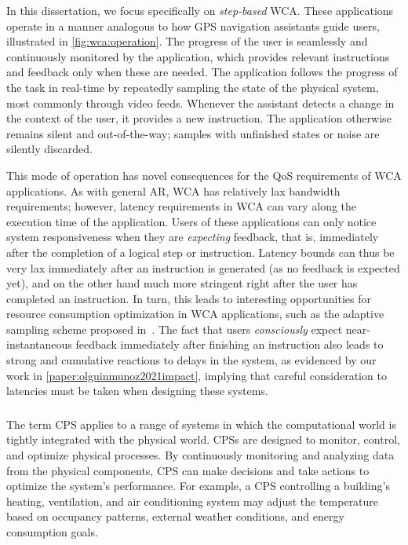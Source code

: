 In this dissertation, we focus specifically on \emph{step-based} \gls{WCA}.
These applications operate in a manner analogous to how \gls{GPS} navigation assistants guide users, illustrated in \cref{fig:wca:operation}.
The progress of the user is seamlessly and continuously monitored by the application, which provides relevant instructions and feedback only when these are needed.
The application follows the progress of the task in real-time by repeatedly sampling the state of the physical system, most commonly through video feeds.
Whenever the assistant detects a change in the context of the user, it provides a new instruction.
The application otherwise remains silent and out-of-the-way; samples with unfinished states or noise are silently discarded.

This mode of operation has novel consequences for the \gls{QoS} requirements of \gls{WCA} applications.
As with general \gls{AR}, \gls{WCA} has relatively lax bandwidth requirements; however, latency requirements in \gls{WCA} can vary along the execution time of the application.
Users of these applications can only notice system responsiveness when they are \emph{expecting} feedback, that is, immediately after the completion of a logical step or instruction.
Latency bounds can thus be very lax immediately after an instruction is generated (as no feedback is expected yet), and on the other hand much more stringent right after the user has completed an instruction.
In turn, this leads to interesting opportunities for resource consumption optimization in \gls{WCA} applications, such as the adaptive sampling scheme proposed in~\cite{wang2019towards}.
The fact that users \emph{consciously} expect near-instantaneous feedback immediately after finishing an instruction also leads to strong and cumulative reactions to delays in the system, as evidenced by our work in \cref{paper:olguinmunoz2021impact}, implying that careful consideration to latencies must be taken when designing these systems.

\subsubsection{}

The term \gls{CPS} applies to a range of systems in which the computational world is tightly integrated with the physical world.
\glspl{CPS} are designed to monitor, control, and optimize physical processes.
By continuously monitoring and analyzing data from the physical components, \gls{CPS} can make decisions and take actions to optimize the system's performance.
For example, a \gls{CPS} controlling a building's heating, ventilation, and air conditioning system may adjust the temperature based on occupancy patterns, external weather conditions, and energy consumption goals.

